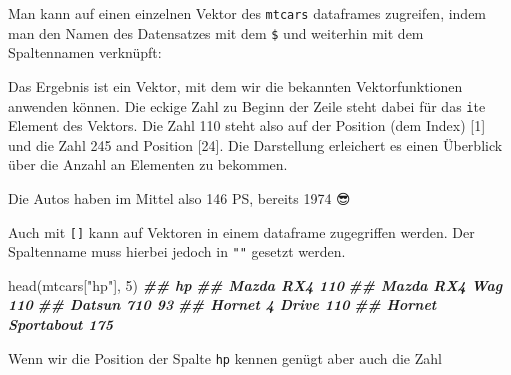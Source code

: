\documentclass[
]{article}
\newenvironment{Shaded}{\begin{snugshade}}{\end{snugshade}}
\newcommand{\CommentTok}[1]{\textcolor[rgb]{0.56,0.35,0.01}{\textit{#1}}}
\newcommand{\DecValTok}[1]{\textcolor[rgb]{0.00,0.00,0.81}{#1}}
\newcommand{\DocumentationTok}[1]{\textcolor[rgb]{0.56,0.35,0.01}{\textbf{\textit{#1}}}}
\newcommand{\FunctionTok}[1]{\textcolor[rgb]{0.00,0.00,0.00}{#1}}
\newcommand{\NormalTok}[1]{#1}
\newcommand{\SpecialCharTok}[1]{\textcolor[rgb]{0.00,0.00,0.00}{#1}}
\newcommand{\StringTok}[1]{\textcolor[rgb]{0.31,0.60,0.02}{#1}}
\begin{document}
Man kann auf einen einzelnen Vektor des \texttt{mtcars} dataframes zugreifen, indem man den Namen des Datensatzes mit dem \texttt{\$} und weiterhin mit dem Spaltennamen verknüpft:

\begin{Shaded}
\end{Shaded}

Das Ergebnis ist ein Vektor, mit dem wir die bekannten Vektorfunktionen anwenden können. Die eckige Zahl zu Beginn der Zeile steht dabei für das \texttt{i}te Element des Vektors. Die Zahl 110 steht also auf der Position (dem Index) {[}1{]} und die Zahl 245 and Position {[}24{]}. Die Darstellung erleichert es einen Überblick über die Anzahl an Elementen zu bekommen.

\begin{Shaded}
\end{Shaded}

Die Autos haben im Mittel also 146 PS, bereits 1974 😎

Auch mit \texttt{{[}{]}} kann auf Vektoren in einem dataframe zugegriffen werden. Der Spaltenname muss hierbei jedoch in \texttt{""} gesetzt werden.

\begin{Shaded}
\begin{Highlighting}[]
\FunctionTok{head}\NormalTok{(mtcars[}\StringTok{"hp"}\NormalTok{], }\DecValTok{5}\NormalTok{)}
\DocumentationTok{\#\#                    hp}
\DocumentationTok{\#\# Mazda RX4         110}
\DocumentationTok{\#\# Mazda RX4 Wag     110}
\DocumentationTok{\#\# Datsun 710         93}
\DocumentationTok{\#\# Hornet 4 Drive    110}
\DocumentationTok{\#\# Hornet Sportabout 175}
\end{Highlighting}
\end{Shaded}

Wenn wir die Position der Spalte \texttt{hp} kennen genügt aber auch die Zahl
\end{document}
